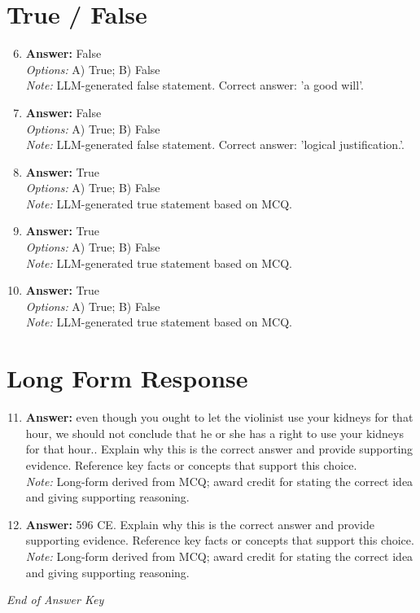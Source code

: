 \documentclass[12pt]{article}
\begin{document}
\section*{True / False}
\begin{enumerate}[label=\arabic*.]
\setcounter{enumi}{5}
\item \textbf{Answer:} False
\\ \textit{Options:} A) True; B) False
\\ \textit{Note:} LLM-generated false statement. Correct answer: 'a good will'.
\item \textbf{Answer:} False
\\ \textit{Options:} A) True; B) False
\\ \textit{Note:} LLM-generated false statement. Correct answer: 'logical justification.'.
\item \textbf{Answer:} True
\\ \textit{Options:} A) True; B) False
\\ \textit{Note:} LLM-generated true statement based on MCQ.
\item \textbf{Answer:} True
\\ \textit{Options:} A) True; B) False
\\ \textit{Note:} LLM-generated true statement based on MCQ.
\item \textbf{Answer:} True
\\ \textit{Options:} A) True; B) False
\\ \textit{Note:} LLM-generated true statement based on MCQ.
\end{enumerate}

\section*{Long Form Response}
\begin{enumerate}[label=\arabic*.]
\setcounter{enumi}{10}
\item \textbf{Answer:} even though you ought to let the violinist use your kidneys for that hour, we should not conclude that he or she has a right to use your kidneys for that hour.. Explain why this is the correct answer and provide supporting evidence. Reference key facts or concepts that support this choice.
\\ \textit{Note:} Long-form derived from MCQ; award credit for stating the correct idea and giving supporting reasoning.
\item \textbf{Answer:} 596 CE. Explain why this is the correct answer and provide supporting evidence. Reference key facts or concepts that support this choice.
\\ \textit{Note:} Long-form derived from MCQ; award credit for stating the correct idea and giving supporting reasoning.
\end{enumerate}

\vfill
\noindent\textit{End of Answer Key}
\end{document}
